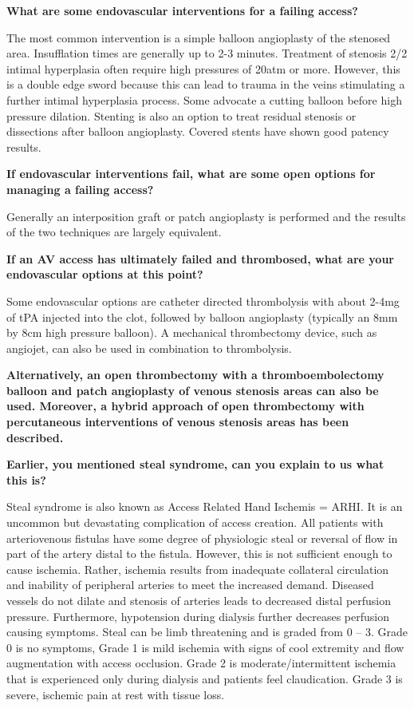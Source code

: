 \documentclass[
]{book}
\begin{document}
\textbf{What are some endovascular interventions for a failing access?}

The most common intervention is a simple balloon angioplasty of the
stenosed area. Insufflation times are generally up to 2-3 minutes.
Treatment of stenosis 2/2 intimal hyperplasia often require high
pressures of 20atm or more. However, this is a double edge sword because
this can lead to trauma in the veins stimulating a further intimal
hyperplasia process. Some advocate a cutting balloon before high
pressure dilation. Stenting is also an option to treat residual stenosis
or dissections after balloon angioplasty. Covered stents have shown good
patency results.

\textbf{If endovascular interventions fail, what are some open options for
managing a failing access?}

Generally an interposition graft or patch angioplasty is performed and
the results of the two techniques are largely equivalent.

\textbf{If an AV access has ultimately failed and thrombosed, what are your
endovascular options at this point?}

Some endovascular options are catheter directed thrombolysis with about
2-4mg of tPA injected into the clot, followed by balloon angioplasty
(typically an 8mm by 8cm high pressure balloon). A mechanical
thrombectomy device, such as angiojet, can also be used in combination
to thrombolysis.

\textbf{Alternatively, an open thrombectomy with a thromboembolectomy balloon
and patch angioplasty of venous stenosis areas can also be used.
Moreover, a hybrid approach of open thrombectomy with percutaneous
interventions of venous stenosis areas has been described.}

\textbf{Earlier, you mentioned steal syndrome, can you explain to us what this
is?}

Steal syndrome is also known as Access Related Hand Ischemis = ARHI. It
is an uncommon but devastating complication of access creation. All
patients with arteriovenous fistulas have some degree of physiologic
steal or reversal of flow in part of the artery distal to the fistula.
However, this is not sufficient enough to cause ischemia. Rather,
ischemia results from inadequate collateral circulation and inability of
peripheral arteries to meet the increased demand. Diseased vessels do
not dilate and stenosis of arteries leads to decreased distal perfusion
pressure. Furthermore, hypotension during dialysis further decreases
perfusion causing symptoms. Steal can be limb threatening and is graded
from 0 -- 3. Grade 0 is no symptoms, Grade 1 is mild ischemia with signs
of cool extremity and flow augmentation with access occlusion. Grade 2
is moderate/intermittent ischemia that is experienced only during
dialysis and patients feel claudication. Grade 3 is severe, ischemic
pain at rest with tissue loss.
\end{document}
